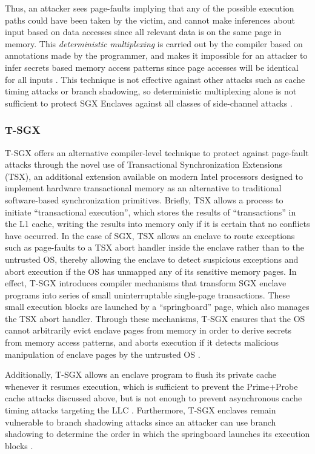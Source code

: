 Thus, an attacker sees page-faults implying that any of the possible execution paths could have been taken by the victim, and cannot make inferences about input based on data accesses since all relevant data is on the same page in memory. This \emph{deterministic multiplexing} is carried out by the compiler based on annotations made by the programmer, and makes it impossible for an attacker to infer secrets based memory access patterns since page accesses will be identical for all inputs \cite{shinde_preventing_2015}. This technique is not effective against other attacks such as cache timing attacks or branch shadowing, so deterministic multiplexing alone is not sufficient to protect SGX Enclaves against all classes of side-channel attacks \cite{shinde_preventing_2015, lee_inferring_2017}.

\subsubsection{T-SGX}

T-SGX offers an alternative compiler-level technique to protect against page-fault attacks through the novel use of Transactional Synchronization Extensions (TSX), an additional extension available on modern Intel processors designed to implement hardware transactional memory as an alternative to traditional software-based synchronization primitives. Briefly, TSX allows a process to initiate ``transactional execution'', which stores the results of ``transactions'' in the L1 cache, writing the results into memory only if it is certain that no conflicts have occurred. In the case of SGX, TSX allows an enclave to route exceptions such as page-faults to a TSX abort handler inside the enclave rather than to the untrusted OS, thereby allowing the enclave to detect suspicious exceptions and abort execution if the OS has unmapped any of its sensitive memory pages. In effect, T-SGX introduces compiler mechanisms that transform SGX enclave programs into series of small uninterruptable single-page transactions. These small execution blocks are launched by a ``springboard'' page, which also manages the TSX abort handler. Through these mechanisms, T-SGX ensures that the OS cannot arbitrarily evict enclave pages from memory in order to derive secrets from memory access patterns, and aborts execution if it detects malicious manipulation of enclave pages by the untrusted OS \cite{shih_t-sgx:_2017}. 

Additionally, T-SGX allows an enclave program to flush its private cache whenever it resumes execution, which is sufficient to prevent the Prime+Probe cache attacks discussed above, but is not enough to prevent asynchronous cache timing attacks targeting the LLC \cite{shih_t-sgx:_2017}. Furthermore, T-SGX enclaves remain vulnerable to branch shadowing attacks since an attacker can use branch shadowing to determine the order in which the springboard launches its execution blocks \cite{lee_inferring_2017}.

